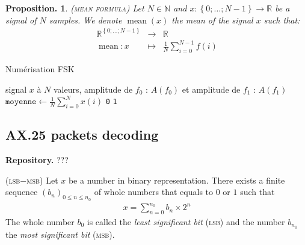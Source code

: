 \documentclass[twocolumn,pre,floats,aps,amsmath,amssymb]{revtex4}
\newtheorem{proposition}[theorem]{Proposition.}
\newenvironment{definition}[1][D\'efinition.]{\begin{trivlist}
\item[\hskip \labelsep {\bfseries #1}]}{\end{trivlist}}
\begin{document}
\begin{proposition}
  \textsc{(mean formula)}
  Let $N \in \mathbb{N}$ and $x : \left \{ 0 ; \dots ; N - 1 \right \} \rightarrow \mathbb{R}$ be a signal of $N$ samples. We denote $\operatorname{mean} (x)$ the \textit{mean of the signal} $x$ such that:
  \begin{eqnarray*}
    \mathbb{R}^{\left \{ 0 ; \dots ; N - 1 \right \}} &\rightarrow& \mathbb{R}\\
    \operatorname{mean} : x &\mapsto& \frac{1}{N}\sum^{N - 1}_{i = 0}{f(i)}
  \end{eqnarray*}
\end{proposition}


\begin{algorithm}[h]
\caption{Num\'erisation FSK}
\label{algo_numerisation_FSK}
\begin{algorithmic}[1]
  \REQUIRE signal $x$ \`a $N$ valeurs, amplitude de $f_0$ : $A(f_0)$ et amplitude de $f_1$ : $A(f_1)$
  \STATE $\texttt{moyenne} \leftarrow \frac{1}{N}\sum^N_{i = 0}{x(i)}$
  \RETURN \texttt{0}
  \ELSE
  \RETURN \texttt{1}
  \ENDIF
\end{algorithmic}
\end{algorithm}

\subsection{AX.25 packets decoding}

\textbf{Repository.} ???

\begin{definition}
  { \color{rltred}{\Radioactivity} }
  \textsc{(lsb$-$msb)}
  Let $x$ be a number in binary representation. There exists a finite sequence $\left ( b_n \right )_{0 \leq n \leq n_0}$ of whole numbers that equals to $0$ or $1$ such that 
  \begin{eqnarray*}
    x = \sum^{n_0}_{n = 0}{b_n \times 2^n}
  \end{eqnarray*}
  The whole number $b_0$ is called the \textit{least significant bit} (\textsc{lsb}) and the number $b_{n_0}$ the \textit{most significant bit} (\textsc{msb}).
\end{definition}
\end{document}
